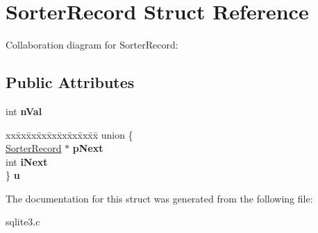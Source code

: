 \hypertarget{structSorterRecord}{}\section{Sorter\+Record Struct Reference}
\label{structSorterRecord}


Collaboration diagram for Sorter\+Record\+:
\subsection*{Public Attributes}
\begin{DoxyCompactItemize}
\item 
int {\bfseries n\+Val}\hypertarget{structSorterRecord_a2b8ffc0f8410826de8b41425759bf462}{}\label{structSorterRecord_a2b8ffc0f8410826de8b41425759bf462}

\item 
\begin{tabbing}
xx\=xx\=xx\=xx\=xx\=xx\=xx\=xx\=xx\=\kill
union \{\\
\>\hyperlink{structSorterRecord}{SorterRecord} $\ast$ {\bfseries pNext}\\
\>int {\bfseries iNext}\\
\} {\bfseries u}\hypertarget{structSorterRecord_a95d438d535a97eb4ed5f57d2677aaa6b}{}\label{structSorterRecord_a95d438d535a97eb4ed5f57d2677aaa6b}
\\

\end{tabbing}\end{DoxyCompactItemize}


The documentation for this struct was generated from the following file\+:\begin{DoxyCompactItemize}
\item 
sqlite3.\+c\end{DoxyCompactItemize}
